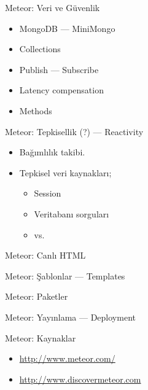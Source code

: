 \documentclass{beamer}
\begin{document}
    \begin{frame}{Meteor: Veri ve G\"uvenlik}
        \begin{itemize}
            \item MongoDB --- MiniMongo
            \item Collections
            \item Publish --- Subscribe
            \item Latency compensation
            \item Methods
        \end{itemize}
    \end{frame}

    \begin{frame}{Meteor: Tepkisellik (?) --- Reactivity}
        \begin{itemize}
            \item Bağımlılık takibi.
            \item Tepkisel veri kaynakları;
                \begin{itemize}
                    \item Session
                    \item Veritabanı sorguları
                    \item vs.
                \end{itemize}
        \end{itemize}
    \end{frame}

    \begin{frame}{Meteor: Canl{\i} HTML}
    \end{frame}

    \begin{frame}{Meteor: \c{S}ablonlar --- Templates}
    \end{frame}

    \begin{frame}{Meteor: Paketler}
    \end{frame}

    \begin{frame}{Meteor: Yay{\i}nlama --- Deployment}
    \end{frame}

    \begin{frame}{Meteor: Kaynaklar}
        \begin{itemize}
            \item \url{http://www.meteor.com/}
            \item \url{http://www.discovermeteor.com}
        \end{itemize}
    \end{frame}
\end{document}
